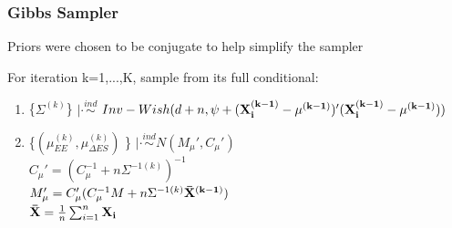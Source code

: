 \documentclass[handout]{beamer}\usepackage[]{graphicx}\usepackage[]{color}
\begin{document}
\begin{frame}
\frametitle{Gibbs Sampler}
Priors were chosen to be conjugate to help simplify the sampler \\

\vspace{0.3cm}

For iteration k=1,...,K, sample from its full conditional:

\begin{enumerate}
% 
% 
% 




\item
 \small \{$\Sigma^{(k)}$\} $|\cdot \overset{ind}{\sim}$ $Inv-Wish(d+n,\psi+({\bf X_{i}^{(k-1)} - \mu^{(k-1)}})'({\bf X_{i}^{(k-1)} - \mu^{(k-1)}}))$ \\




\item
  \{$(\mu_{EE}^{(k)},\mu_{\Delta ES}^{(k)})$ \} $|\cdot \overset{ind}{\sim} N(M_{\mu}',C_{\mu}')$ \\
$C_{\mu}' = (C_{\mu}^{-1} + n \Sigma^{-1(k)})^{-1}$ \\
$M_{\mu}' = C_{\mu}'(C_{\mu}^{-1}M + n \Sigma^{-1(k)} {\bf \bar{X}^{(k-1)}})$ \\
${\bf \bar{X}} = \frac{1}{n}\sum_{i=1}^{n} {\bf X_{i}}$ \\


\end{enumerate}
\end{frame}
\end{document}
